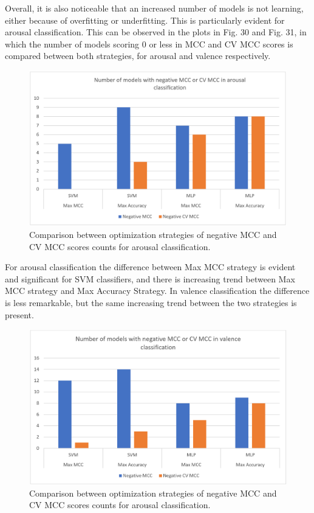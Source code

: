 Overall, it is also noticeable that an increased number of models is not learning, either because of overfitting or underfitting. This is particularly evident for arousal classification. This can be observed in the plots in Fig. 30 and Fig. 31, in which the number of models scoring 0 or less in MCC and CV MCC scores is compared between both strategies, for arousal and valence respectively.

\begin{figure}[h!]
\includegraphics[width=12cm]{img/results/arousal_strategy_comparison.png}
\centering
\caption{Comparison between optimization strategies of negative MCC and CV MCC scores counts for arousal classification.} \label{fig:arousal_strategy_comparison}
\end{figure}

For arousal classification the difference between Max MCC strategy is evident and significant for SVM classifiers, and there is increasing trend between Max MCC strategy and Max Accuracy Strategy. In valence classification the difference is less remarkable, but the same increasing trend between the two strategies is present.

\begin{figure}[h!]
\includegraphics[width=12cm]{img/results/valence_strategy_comparison.png}
\centering
\caption{Comparison between optimization strategies of negative MCC and CV MCC scores counts for arousal classification.} \label{fig:valence_strategy_comparison}
\end{figure}

